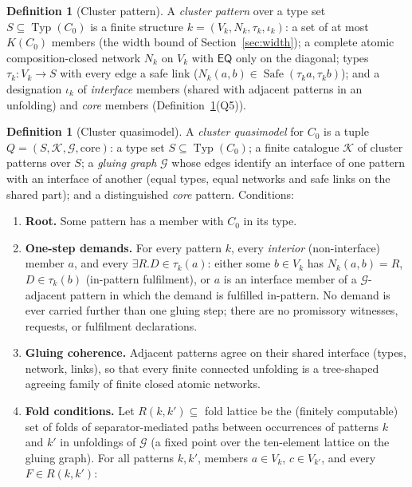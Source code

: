 \documentclass[11pt]{article}
\theoremstyle{definition}
\newtheorem{definition}[theorem]{Definition}
\newcommand{\EQ}{\mathsf{EQ}}
\newcommand{\Typ}{\operatorname{Typ}}
\newcommand{\Safe}{\operatorname{Safe}}
\begin{document}
\begin{definition}[Cluster pattern]\label{def:pattern}
A \emph{cluster pattern} over a type set $S\subseteq\Typ(C_0)$ is a
finite structure $k=(V_k,N_k,\tau_k,\iota_k)$: a set of at most
$K(C_0)$ members (the width bound of Section~\ref{sec:width}); a
complete atomic composition-closed network $N_k$ on $V_k$ with $\EQ$
only on the diagonal; types $\tau_k:V_k\to S$ with every edge a safe
link ($N_k(a,b)\in\Safe(\tau_k a,\tau_k b)$); and a designation
$\iota_k$ of \emph{interface} members (shared with adjacent patterns in
an unfolding) and \emph{core} members (Definition~\ref{def:cq}(Q5)).
\end{definition}

\begin{definition}[Cluster quasimodel]\label{def:cq}
A \emph{cluster quasimodel} for $C_0$ is a tuple
$Q=(S,\mathcal K,\mathcal G,\mathrm{core})$: a type set
$S\subseteq\Typ(C_0)$; a finite catalogue $\mathcal K$ of cluster
patterns over $S$; a \emph{gluing graph} $\mathcal G$ whose edges
identify an interface of one pattern with an interface of another
(equal types, equal networks and safe links on the shared part); and a
distinguished \emph{core} pattern.  Conditions:
\begin{enumerate}[label=(Q\arabic*),leftmargin=2.6em]
\item \textbf{Root.}  Some pattern has a member with $C_0$ in its type.
\item \textbf{One-step demands.}  For every pattern $k$, every
\emph{interior} (non-interface) member $a$, and every
$\exists R.D\in\tau_k(a)$: either some $b\in V_k$ has $N_k(a,b)=R$,
$D\in\tau_k(b)$ (in-pattern fulfilment), or $a$ is an interface member
of a $\mathcal G$-adjacent pattern in which the demand is fulfilled
in-pattern.  No demand is ever carried further than one gluing step;
there are no promissory witnesses, requests, or fulfilment
declarations.
\item \textbf{Gluing coherence.}  Adjacent patterns agree on their
shared interface (types, network, links), so that every finite
connected unfolding is a tree-shaped agreeing family of finite closed
atomic networks.
\item \textbf{Fold conditions.}  Let $R(k,k')\subseteq$ fold lattice be
the (finitely computable) set of folds of separator-mediated paths
between occurrences of patterns $k$ and $k'$ in unfoldings of
$\mathcal G$ (a fixed point over the ten-element lattice on the gluing
graph).  For all patterns $k,k'$, members $a\in V_k$, $c\in V_{k'}$,
and every $F\in R(k,k')$:

\end{enumerate}
\end{definition}
\end{document}
